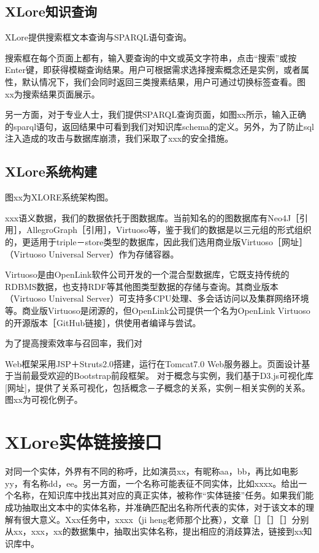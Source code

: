 \subsection{XLore知识查询}
XLore提供搜索框文本查询与SPARQL语句查询。

搜索框在每个页面上都有，输入要查询的中文或英文字符串，点击“搜索”或按Enter键，即获得模糊查询结果。用户可根据需求选择搜索概念还是实例，或者属性，默认情况下，我们会同时返回三类搜素结果，用户可通过切换标签查看。图xx为搜索结果页面展示。

另一方面，对于专业人士，我们提供SPARQL查询页面，如图xx所示，输入正确的sparql语句，返回结果中可看到我们对知识库schema的定义。另外，为了防止sql注入造成的攻击与数据库崩溃，我们采取了xxx的安全措施。

\subsection{XLore系统构建}
图xx为XLORE系统架构图。

xxx语义数据，我们的数据依托于图数据库。当前知名的的图数据库有Neo4J［引用］，AllegroGraph［引用］，Virtuoso等，鉴于我们的数据是以三元组的形式组织的，更适用于triple－store类型的数据库，因此我们选用商业版Virtuoso［网址］（Virtuoso Universal Server）作为存储容器。

Virtuoso是由OpenLink软件公司开发的一个混合型数据库，它既支持传统的RDBMS数据，也支持RDF等其他图类型数据的存储与查询。其商业版本（Virtuoso Universal Server）可支持多CPU处理、多会话访问以及集群网络环境等。商业版Virtuoso是闭源的，但OpenLink公司提供一个名为OpenLink Virtuoso的开源版本［GitHub链接］，供使用者编译与尝试。

为了提高搜索效率与召回率，我们对

Web框架采用JSP＋Struts2.0搭建，运行在Tomcat7.0 Web服务器上。页面设计基于当前最受欢迎的Bootstrap前段框架。
对于概念与实例，我们基于D3.js可视化库[网址]，提供了关系可视化，包括概念－子概念的关系，实例－相关实例的关系。图xx为可视化例子。

\section{XLore实体链接接口}

对同一个实体，外界有不同的称呼，比如演员xx，有昵称aa，bb，再比如电影yy，有名称dd，ee。另一方面，一个名称可能表征不同实体，比如xxxx。给出一个名称，在知识库中找出其对应的真正实体，被称作“实体链接”任务。如果我们能成功抽取出文本中的实体名称，并准确匹配出名称所代表的实体，对于该文本的理解有很大意义。Xxx任务中，xxxx（ji heng老师那个比赛），文章［］［］［］分别从xx，xxx，xx的数据集中，抽取出实体名称，提出相应的消歧算法，链接到xx知识库中。

